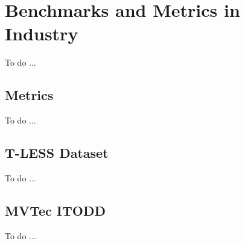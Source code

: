 \chapter{Benchmarks and Metrics in Industry}\label{ch:benchmarks_and_metrics}
To do ...

\section{Metrics}\label{sec:metrics}
To do ...

\section{T-LESS Dataset}\label{sec:tless_dataset}
To do ...

\section{MVTec ITODD}\label{sec:mvtex_itodd}
To do ...